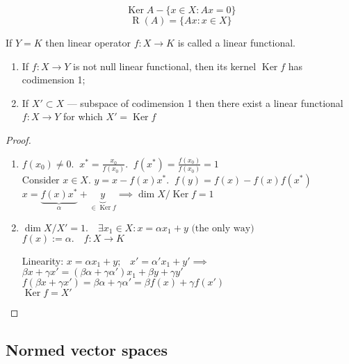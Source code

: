   \[ \operatorname{Ker} A - \{x \in  X: Ax = 0\}  \] 
  \[ \operatorname{R}(A) = \{Ax : x \in  X\}  \] 

  \begin{definition}
    If $Y = K$ then linear operator $f: X \to K$ is called a linear functional.
  \end{definition}

\begin{proposition}
 \begin{enumerate}
   \item If $f: X \to Y$ is not null linear functional, then its kernel $\operatorname{Ker} f$ has codimension 1;
   \item If $X' \subset X$ --- subspace of codimension 1 then there exist a linear functional $f: X\to Y$ for which
     $X' = \operatorname{Ker}f$
 \end{enumerate}
\end{proposition}

\begin{proof}
  \begin{enumerate}
    \item 
      $f(x_0) \neq 0. \;\; x^{*} = \frac{x_0}{f(x_0)}. \;\; f(x^{*}) = \frac{f(x_0)}{f(x_0)} = 1$\\
      Consider  $x \in  X$. $y = x - f(x)x^{*}. \;\; f(y) = f(x) - f(x)f(x^{*})$\\
      $x = \underbrace{f(x)x^{*}}_{\alpha} + \underbrace{y}_{\in \operatorname{Ker}f} \implies \operatorname{dim}X / \operatorname{Ker}f = 1$ 

    \item $\operatorname{dim}X / X' = 1. \quad \exists x_1 \in  X: x = \alpha x_1 + y \text{ (the only way) }$\\
      $f(x) := \alpha. \quad f: X \to K$

      Linearity: $x = \alpha x_1 + y; \;\;\; x' = \alpha' x_1 + y' \implies$ \\
      $\beta x + \gamma x' = (\beta \alpha + \gamma \alpha')x_1 + \beta y + \gamma y'$\\
      $f(\beta x + \gamma x') = \beta \alpha + \gamma \alpha' = \beta f(x) + \gamma f(x')$\\
      $\operatorname{Ker}f = X'$
  \end{enumerate}
\end{proof}


\subsection{Normed vector spaces}

